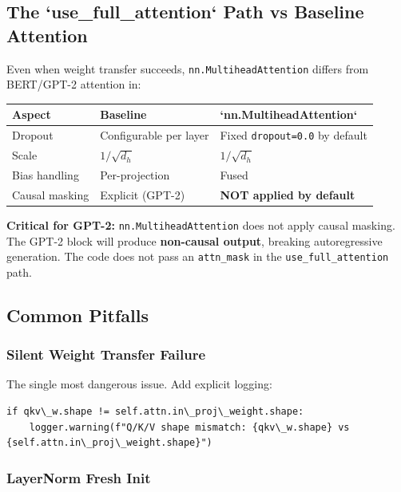 \subsection{The `use\_full\_attention` Path vs Baseline Attention}

Even when weight transfer succeeds, \texttt{nn.MultiheadAttention} differs from 
BERT/GPT-2 attention in:

\begin{table}[H]
\centering
\small
\begin{tabular}{lll}
\toprule
\textbf{Aspect} & \textbf{Baseline} & \textbf{`nn.MultiheadAttention`} \\
\midrule
Dropout & Configurable per layer & Fixed \texttt{dropout=0.0} by default \\
Scale & $1/\sqrt{d_h}$ & $1/\sqrt{d_h}$ \\
Bias handling & Per-projection & Fused \\
Causal masking & Explicit (GPT-2) & \textbf{NOT applied by default} \\
\bottomrule
\end{tabular}
\end{table}

\textbf{Critical for GPT-2:} \texttt{nn.MultiheadAttention} does not apply causal masking. 
The GPT-2 block will produce \textbf{non-causal output}, breaking autoregressive 
generation. The code does not pass an \texttt{attn\_mask} in the \texttt{use\_full\_attention} 
path.

\subsection{Common Pitfalls}

\subsubsection{Silent Weight Transfer Failure}

The single most dangerous issue. Add explicit logging:

\begin{lstlisting}
if qkv\_w.shape != self.attn.in\_proj\_weight.shape:
    logger.warning(f"Q/K/V shape mismatch: {qkv\_w.shape} vs {self.attn.in\_proj\_weight.shape}")
\end{lstlisting}

\subsubsection{LayerNorm Fresh Init}


